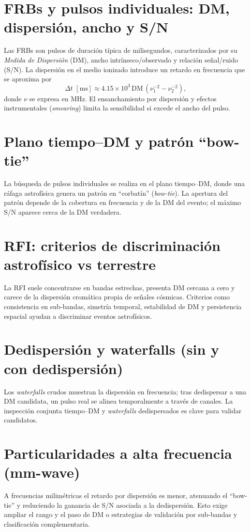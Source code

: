 
\section{FRBs y pulsos individuales: DM, dispersión, ancho y S/N}
Las FRBs son pulsos de duración típica de milisegundos, caracterizados por su \textit{Medida de Dispersión} (DM), ancho intrínseco/observado y relación señal/ruido (S/N). La dispersión en el medio ionizado introduce un retardo en frecuencia que se aproxima por
\[\Delta t\,\,\mathrm{[ms]} \approx 4.15\times10^3\,\mathrm{DM}\,\left(\nu_1^{-2}-\nu_2^{-2}\right),\]
donde \(\nu\) se expresa en MHz. El ensanchamiento por dispersión y efectos instrumentales (\textit{smearing}) limita la sensibilidad si excede el ancho del pulso.

\section{Plano tiempo--DM y patrón ``bow-tie''}
La búsqueda de pulsos individuales se realiza en el plano tiempo--DM, donde una ráfaga astrofísica genera un patrón en ``corbatín'' (\textit{bow-tie}). La apertura del patrón depende de la cobertura en frecuencia y de la DM del evento; el máximo S/N aparece cerca de la DM verdadera.

\section{RFI: criterios de discriminación astrofísico vs terrestre}
La RFI suele concentrarse en bandas estrechas, presenta DM cercana a cero y carece de la dispersión cromática propia de señales cósmicas. Criterios como consistencia en sub-bandas, simetría temporal, estabilidad de DM y persistencia espacial ayudan a discriminar eventos astrofísicos.

\section{Dedispersión y waterfalls (sin y con dedispersión)}
Los \textit{waterfalls} crudos muestran la dispersión en frecuencia; tras dedispersar a una DM candidata, un pulso real se alinea temporalmente a través de canales. La inspección conjunta tiempo--DM y \textit{waterfalls} dedispersados es clave para validar candidatos.

\section{Particularidades a alta frecuencia (mm-wave)}
A frecuencias milimétricas el retardo por dispersión es menor, atenuando el ``bow-tie'' y reduciendo la ganancia de S/N asociada a la dedispersión. Esto exige ampliar el rango y el paso de DM o estrategias de validación por sub-bandas y clasificación complementaria.

